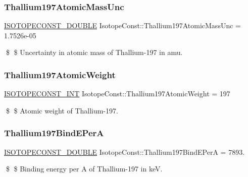 \subsubsection{\texorpdfstring{Thallium197\+Atomic\+Mass\+Unc}{Thallium197AtomicMassUnc}}
{\footnotesize\ttfamily \mbox{\hyperlink{group___isotope_const-_macros_ga8f45a7272ce02c0b4c65c44636ed719a}{I\+S\+O\+T\+O\+P\+E\+C\+O\+N\+S\+T\+\_\+\+D\+O\+U\+B\+LE}} Isotope\+Const\+::\+Thallium197\+Atomic\+Mass\+Unc = 1.\+7526e-\/05}

\$ \$ Uncertainty in atomic mass of Thallium-\/197 in amu. \mbox{\label{group___isotope_const-_thallium-_tl197_ga939c7b7c75b3d274691f4d997e8701d2}} 
\subsubsection{\texorpdfstring{Thallium197\+Atomic\+Weight}{Thallium197AtomicWeight}}
{\footnotesize\ttfamily \mbox{\hyperlink{group___isotope_const-_macros_ga5f18360b3e99483a35c32d789e62621c}{I\+S\+O\+T\+O\+P\+E\+C\+O\+N\+S\+T\+\_\+\+I\+NT}} Isotope\+Const\+::\+Thallium197\+Atomic\+Weight = 197}

\$ \$ Atomic weight of Thallium-\/197. \mbox{\label{group___isotope_const-_thallium-_tl197_ga09b0a9d47d04fae1585e96feb121e330}} 
\subsubsection{\texorpdfstring{Thallium197\+Bind\+E\+PerA}{Thallium197BindEPerA}}
{\footnotesize\ttfamily \mbox{\hyperlink{group___isotope_const-_macros_ga8f45a7272ce02c0b4c65c44636ed719a}{I\+S\+O\+T\+O\+P\+E\+C\+O\+N\+S\+T\+\_\+\+D\+O\+U\+B\+LE}} Isotope\+Const\+::\+Thallium197\+Bind\+E\+PerA = 7893.}

\$ \$ Binding energy per A of Thallium-\/197 in keV. \mbox{\label{group___isotope_const-_thallium-_tl197_ga4fd881fbd9429e893ba762da2b62c9d8}} 
